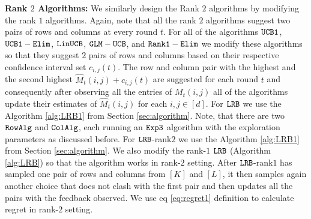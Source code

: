 
\textbf{Rank $2$ Algorithms:} We similarly design the Rank $2$ algorithms by modifying the rank $1$ algorithms. Again, note that all the rank $2$ algorithms suggest two pairs of rows and columns at every round $t$. For all of the algorithms ${\tt UCB1}$, ${\tt UCB1-Elim}$, ${\tt LinUCB}$, $\tt GLM-UCB$, and $\tt Rank1-Elim$ we modify these algorithms so that they suggest $2$ pairs of rows and columns based on their respective confidence interval set $c_{i, j}(t)$. The row and column pair with the highest and the second highest $\hat{M}_{t}(i,j) + c_{i, j}(t)$ are suggested for each round $t$ and consequently after observing all the entries of $M_t(i,j)$ all of the algorithms update their estimates of $\hat{M}_{t}(i,j)$ for each $i,j \in [d]$. For ${\tt LRB}$ we use the Algorithm \ref{alg:LRB1} from Section \ref{sec:algorithm}. Note, that there are two ${\tt RowAlg}$ and ${\tt ColAlg}$, each running an ${\tt Exp3}$ algorithm with the  exploration parameters as discussed before. For ${\tt LRB}$-rank$2$ we use the Algorithm \ref{alg:LRB1} from Section \ref{sec:algorithm}. We also modify the rank-$1$ ${\tt LRB}$ (Algorithm \ref{alg:LRB}) so that the algorithm works in rank-$2$ setting. After ${\tt LRB}$-rank$1$ has sampled one pair of rows and columns from $[K]$ and $[L]$, it then samples again another choice that does not clash with the first pair and then updates all the pairs with the feedback observed. We use eq \eqref{eq:regret1} definition to calculate regret in rank-$2$ setting.

